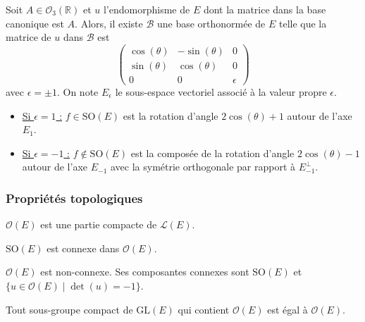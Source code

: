 	\begin{theorem}
		Soit $A \in \mathcal{O}_3(\mathbb{R})$ et $u$ l'endomorphisme de $E$ dont la matrice dans la base canonique est $A$. Alors, il existe $\mathcal{B}$ une base orthonormée de $E$ telle que la matrice de $u$ dans $\mathcal{B}$ est
		\[ \begin{pmatrix} \cos(\theta) & -\sin(\theta) & 0 \\ \sin(\theta) & \cos(\theta) & 0 \\ 0 & 0 & \epsilon \end{pmatrix} \]
		avec $\epsilon = \pm 1$. On note $E_\epsilon$ le sous-espace vectoriel associé à la valeur propre $\epsilon$.
		\begin{itemize}
			\item \underline{Si $\epsilon = 1$ :} $f \in \mathrm{SO}(E)$ est la rotation d'angle $2\cos(\theta) + 1$ autour de l'axe $E_1$.
			\item \underline{Si $\epsilon = -1$ :} $f \notin \mathrm{SO}(E)$ est la composée de la rotation d'angle $2\cos(\theta) - 1$ autour de l'axe $E_{-1}$ avec la symétrie orthogonale par rapport à $E_{-1}^{\perp}$.
		\end{itemize}
	\end{theorem}
	
	\subsubsection{Propriétés topologiques}
	
	
	\begin{proposition}
		$\mathcal{O}(E)$ est une partie compacte de $\mathcal{L}(E)$.
	\end{proposition}
	
	\begin{proposition}
		$\mathrm{SO}(E)$ est connexe dans $\mathcal{O}(E)$.
	\end{proposition}
	
	\begin{corollary}
		$\mathcal{O}(E)$ est non-connexe. Ses composantes connexes sont $\mathrm{SO}(E)$ et $\{ u \in \mathcal{O}(E) \mid \det(u) = -1 \}$.
	\end{corollary}
	
	
	\begin{proposition}
		Tout sous-groupe compact de $\mathrm{GL}(E)$ qui contient $\mathcal{O}(E)$ est égal à $\mathcal{O}(E)$.
	\end{proposition}
	
